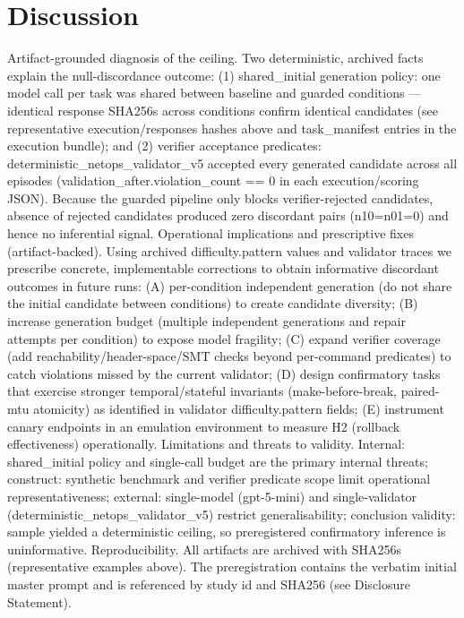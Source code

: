 \documentclass[conference]{IEEEtran}
\begin{document}
\section{Discussion}
Artifact-grounded diagnosis of the ceiling. Two deterministic, archived facts explain the null-discordance outcome: (1) shared\_initial generation policy: one model call per task was shared between baseline and guarded conditions --- identical response SHA256s across conditions confirm identical candidates (see representative execution/responses hashes above and task\_manifest entries in the execution bundle); and (2) verifier acceptance predicates: deterministic\_netops\_validator\_v5 accepted every generated candidate across all episodes (validation\_after.violation\_count == 0 in each execution/scoring JSON). Because the guarded pipeline only blocks verifier-rejected candidates, absence of rejected candidates produced zero discordant pairs (n10=n01=0) and hence no inferential signal. Operational implications and prescriptive fixes (artifact-backed). Using archived difficulty.pattern values and validator traces we prescribe concrete, implementable corrections to obtain informative discordant outcomes in future runs: (A) per-condition independent generation (do not share the initial candidate between conditions) to create candidate diversity; (B) increase generation budget (multiple independent generations and repair attempts per condition) to expose model fragility; (C) expand verifier coverage (add reachability/header-space/SMT checks beyond per-command predicates) to catch violations missed by the current validator; (D) design confirmatory tasks that exercise stronger temporal/stateful invariants (make-before-break, paired-mtu atomicity) as identified in validator difficulty.pattern fields; (E) instrument canary endpoints in an emulation environment to measure H2 (rollback effectiveness) operationally. Limitations and threats to validity. Internal: shared\_initial policy and single-call budget are the primary internal threats; construct: synthetic benchmark and verifier predicate scope limit operational representativeness; external: single-model (gpt-5-mini) and single-validator (deterministic\_netops\_validator\_v5) restrict generalisability; conclusion validity: sample yielded a deterministic ceiling, so preregistered confirmatory inference is uninformative. Reproducibility. All artifacts are archived with SHA256s (representative examples above). The preregistration contains the verbatim initial master prompt and is referenced by study id and SHA256 (see Disclosure Statement).
\end{document}
